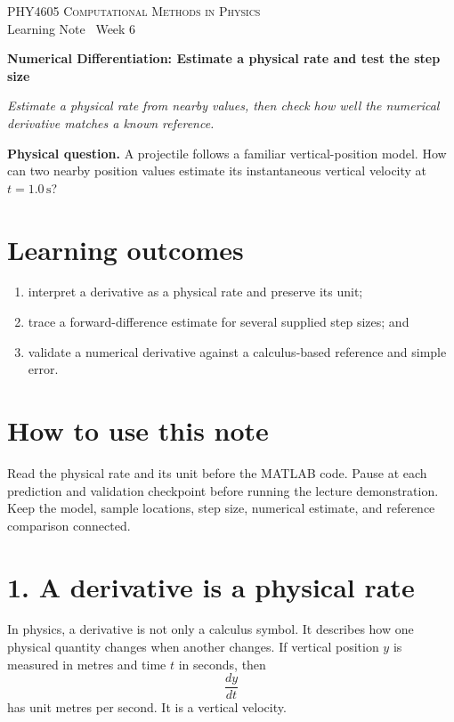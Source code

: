 \documentclass[11pt,a4paper]{article}
\newcommand{\course}{PHY4605 Computational Methods in Physics}
\newcommand{\units}[1]{\,\mathrm{#1}}
\begin{document}
{\large\textsc{\course}}\\[-2pt]
{\small Learning Note \textbar\ Week 6}\par\vspace{4pt}
{\LARGE\bfseries Numerical Differentiation: Estimate a physical rate and test the step size}\par\vspace{3pt}
\textit{Estimate a physical rate from nearby values, then check how well the numerical derivative matches a known reference.}

\begin{keybox}\textbf{Physical question.} A projectile follows a familiar vertical-position model. How can two nearby position values estimate its instantaneous vertical velocity at $t=1.0\units{s}$?\end{keybox}

\section*{Learning outcomes}
\begin{enumerate}[nosep,leftmargin=5mm]
\item interpret a derivative as a physical rate and preserve its unit;
\item trace a forward-difference estimate for several supplied step sizes; and
\item validate a numerical derivative against a calculus-based reference and simple error.
\end{enumerate}

\section*{How to use this note}
Read the physical rate and its unit before the MATLAB code. Pause at each prediction and validation checkpoint before running the lecture demonstration. Keep the model, sample locations, step size, numerical estimate, and reference comparison connected.

\section*{1. A derivative is a physical rate}
In physics, a derivative is not only a calculus symbol. It describes how one physical quantity changes when another changes. If vertical position $y$ is measured in metres and time $t$ in seconds, then
\[
\frac{dy}{dt}
\]
has unit metres per second. It is a vertical velocity.
\end{document}
